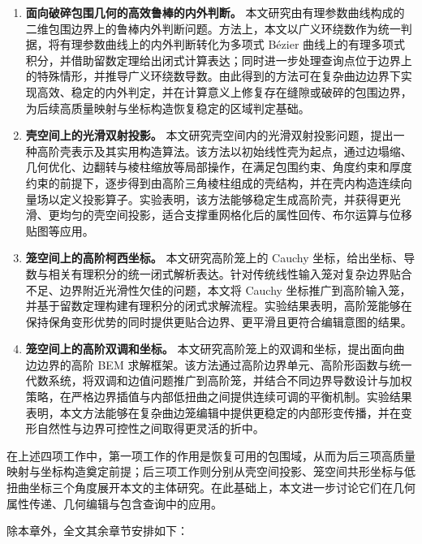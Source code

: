 \begin{enumerate}
  \item \textbf{面向破碎包围几何的高效鲁棒的内外判断。}
  本文研究由有理参数曲线构成的二维包围边界上的鲁棒内外判断问题。方法上，本文以广义环绕数作为统一判据，将有理参数曲线上的内外判断转化为多项式 B\'{e}zier 曲线上的有理多项式积分，并借助留数定理给出闭式计算表达；同时进一步处理查询点位于边界上的特殊情形，并推导广义环绕数导数。由此得到的方法可在复杂曲边边界下实现高效、稳定的内外判定，并在计算意义上修复存在缝隙或破碎的包围边界，为后续高质量映射与坐标构造恢复稳定的区域判定基础。
  \item \textbf{壳空间上的光滑双射投影。}
  本文研究壳空间内的光滑双射投影问题，提出一种高阶壳表示及其实用构造算法。该方法以初始线性壳为起点，通过边塌缩、几何优化、边翻转与棱柱缩放等局部操作，在满足包围约束、角度约束和厚度约束的前提下，逐步得到由高阶三角棱柱组成的壳结构，并在壳内构造连续向量场以定义投影算子。实验表明，该方法能够稳定生成高阶壳，并获得更光滑、更均匀的壳空间投影，适合支撑重网格化后的属性回传、布尔运算与位移贴图等应用。
  \item \textbf{笼空间上的高阶柯西坐标。}
  本文研究高阶笼上的 Cauchy 坐标，给出坐标、导数与相关有理积分的统一闭式解析表达。针对传统线性输入笼对复杂边界贴合不足、边界附近光滑性欠佳的问题，本文将 Cauchy 坐标推广到高阶输入笼，并基于留数定理构建有理积分的闭式求解流程。实验结果表明，高阶笼能够在保持保角变形优势的同时提供更贴合边界、更平滑且更符合编辑意图的结果。
  \item \textbf{笼空间上的高阶双调和坐标。}
  本文研究高阶笼上的双调和坐标，提出面向曲边边界的高阶 BEM 求解框架。该方法通过高阶边界单元、高阶形函数与统一代数系统，将双调和边值问题推广到高阶笼，并结合不同边界导数设计与加权策略，在严格边界插值与内部低扭曲之间提供连续可调的平衡机制。实验结果表明，本文方法能够在复杂曲边笼编辑中提供更稳定的内部形变传播，并在变形自然性与边界可控性之间取得更灵活的折中。
\end{enumerate}

在上述四项工作中，第一项工作的作用是恢复可用的包围域，从而为后三项高质量映射与坐标构造奠定前提；后三项工作则分别从壳空间投影、笼空间共形坐标与低扭曲坐标三个角度展开本文的主体研究。在此基础上，本文进一步讨论它们在几何属性传递、几何编辑与包含查询中的应用。

除本章外，全文其余章节安排如下：

